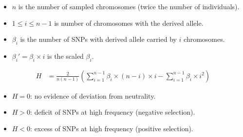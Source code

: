 \documentclass[8pt]{beamer}
\begin{document}
	\begin{frame}
		\centering
	\end{frame}
	\begin{frame}
		\begin{itemize}[label=$\bullet$]
			\item $n$ is the number of sampled chromosomes (twice the number of individuals).
			\item $1 \leq i \leq n - 1 $ is number of chromosomes with the derived allele.
			\item $\beta_i$ is the number of SNPs with derived allele carried by $i$ chromosomes.
			\item $\beta_i' = \beta_i \times i $ is the scaled $\beta_i$.
		\end{itemize}
	\end{frame}
	\begin{frame}
		\begin{align*}
			H & = \frac{2}{n(n-1)} \left( \sum_{i=1}^{n-1} \beta_i \times (n-i) \times i   - \sum_{i=1}^{n-1} \beta_i \times i^2 \right)
		\end{align*}
		\begin{itemize}[label=$\bullet$]
			\item $H = 0$:  no evidence of deviation from neutrality. 
			\item $H > 0$: deficit of SNPs at high frequency (negative selection).
			\item $H < 0$: excess of SNPs at high frequency (positive selection).
		\end{itemize}
	\end{frame}
\end{document}
